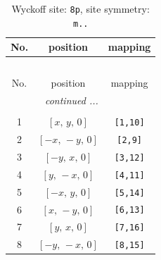 \documentclass[fleqn,8pt]{jsarticle}
\begin{document}
\renewcommand{\arraystretch}{1.2}
\begin{longtable}{ccc}
\caption{Wyckoff site: {\tt 8p}, site symmetry: {\tt m..}}
 \\
 \hline \hline
No. & position & mapping \\ \hline \endfirsthead

\multicolumn{2}{l}{\tablename\ \thetable{}} \\
 \hline \hline
No. & position & mapping \\ \hline \endhead

 \hline \hline
\multicolumn{2}{r}{\footnotesize\it continued ...} \\ \endfoot

 \hline \hline
\multicolumn{2}{r}{} \\ \endlastfoot

1 & $\left[ x,\, y,\, 0 \right]$ & {\tt [1,10]} \\ \hline
2 & $\left[ - x,\, - y,\, 0 \right]$ & {\tt [2,9]} \\ \hline
3 & $\left[ - y,\, x,\, 0 \right]$ & {\tt [3,12]} \\ \hline
4 & $\left[ y,\, - x,\, 0 \right]$ & {\tt [4,11]} \\ \hline
5 & $\left[ - x,\, y,\, 0 \right]$ & {\tt [5,14]} \\ \hline
6 & $\left[ x,\, - y,\, 0 \right]$ & {\tt [6,13]} \\ \hline
7 & $\left[ y,\, x,\, 0 \right]$ & {\tt [7,16]} \\ \hline
8 & $\left[ - y,\, - x,\, 0 \right]$ & {\tt [8,15]} \\
\end{longtable}
\renewcommand{\arraystretch}{1.2}
\end{document}
